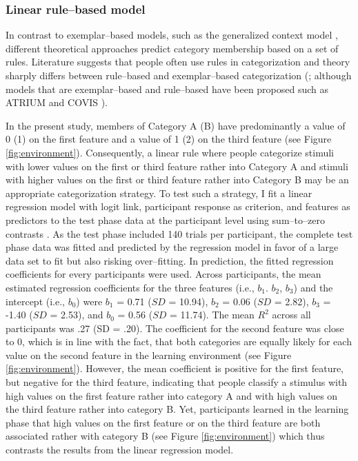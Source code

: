 \documentclass[a4paper,man,natbib]{apa6}
\begin{document}
\subsubsection{Linear rule--based model}
In contrast to exemplar--based models, such as the generalized context model \citep{nosofsky1986attention}, different theoretical approaches predict category membership based on a set of rules. Literature suggests that people often use rules in categorization \citep{restle1962selection, tom1968attention, rouder2006comparing} and theory sharply differs between rule--based and exemplar--based categorization (\citealp{rouder2006comparing}; although models that are exemplar--based and rule--based have been proposed such as ATRIUM \citealp{erickson1998rules} and COVIS \citealp{ashby2011covis}). 

In the present study, members of Category A (B) have predominantly a value of 0 (1) on the first feature and a value of 1 (2) on the third feature (see Figure \ref{fig:environment}). Consequently, a linear rule where people categorize stimuli with lower values on the first or third feature rather into Category A and stimuli with higher values on the first or third feature rather into Category B may be an appropriate categorization strategy. To test such a strategy, I fit a linear regression model with logit link, participant response as criterion, and features as predictors to the test phase data at the participant level using sum--to--zero contrasts \citep{singmann2017introduction}. As the test phase included 140 trials per participant, the complete test phase data was fitted and predicted by the regression model in favor of a large data set to fit but also risking over--fitting. In prediction, the fitted regression coefficients for every participants were used. Across participants, the mean estimated regression coefficients for the three features (i.e., $b_1$. $b_2$, $b_3$) and the intercept (i.e., $b_0$) were $b_1$ = 0.71 ($SD$ = 10.94), $b_2$ = 0.06 ($SD$ = 2.82), $b_3$ = -1.40 ($SD$ = 2.53), and $b_0$ = 0.56 ($SD$ = 11.74). The mean $R^2$ across all participants was .27 (SD = .20). The coefficient for the second feature was close to 0, which is in line with the fact, that both categories are equally likely for each value on the second feature in the learning environment (see Figure \ref{fig:environment}). However, the mean coefficient is positive for the first feature, but negative for the third feature, indicating that people classify a stimulus with high values on the first feature rather into category A and with high values on the third feature rather into category B. Yet, participants learned in the learning phase that high values on the first feature or on the third feature are both associated rather with category B (see Figure \ref{fig:environment}) which thus contrasts the results from the linear regression model.
\end{document}
